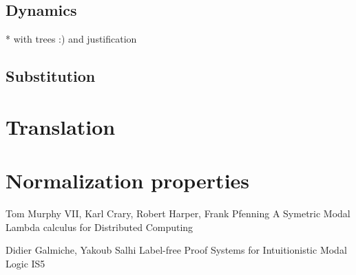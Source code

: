 \documentclass[12pt]{article}
\begin{document}
\subsection{Dynamics}

* with trees :) and justification

\subsection{Substitution}

\section{Translation}

\section{Normalization properties}

\begin{thebibliography}{9}
 	Tom Murphy VII, Karl Crary, Robert Harper, Frank Pfenning
	A Symetric Modal Lambda calculus for Distributed Computing

	Didier Galmiche, Yakoub Salhi
	Label-free Proof Systems for Intuitionistic Modal Logic IS5
\end{thebibliography}
\end{document}
